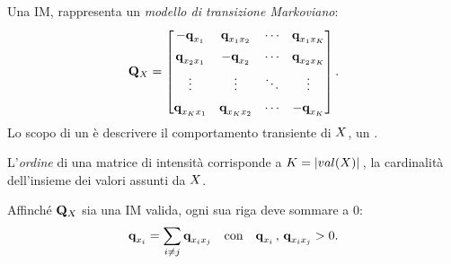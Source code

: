 \begin{definizione}[\upcase\im*{}]
\label{defn:im}
Una \acf{IM}, rappresenta un \emph{modello di transizione Markoviano}:
\[
\mathbf{Q}_{\mathnormal{X}}=
\begin{bmatrix}
    -\boldsymbol{\textbf{\text{q}}}_{\mathnormal{x}_1}            & \boldsymbol{\textbf{\text{q}}}_{\mathnormal{x}_1\mathnormal{x}_2}    & \cdots & \boldsymbol{\textbf{\text{q}}}_{\mathnormal{x}_1\mathnormal{x}_K}   \\[0.5em]
    \boldsymbol{\textbf{\text{q}}}_{\mathnormal{x}_2\mathnormal{x}_1}  & -\boldsymbol{\textbf{\text{q}}}_{\mathnormal{x}_2}              & \cdots & \boldsymbol{\textbf{\text{q}}}_{\mathnormal{x}_2\mathnormal{x}_K}   \\[0.5em]
    \vdots                              & \vdots                                & \ddots & \vdots                               \\[0.5em]
    \boldsymbol{\textbf{\text{q}}}_{\mathnormal{x}_K\mathnormal{x}_1}  & \boldsymbol{\textbf{\text{q}}}_{\mathnormal{x}_K\mathnormal{x}_2}    & \cdots & -\boldsymbol{\textbf{\text{q}}}_{\mathnormal{x}_K}
\end{bmatrix}\text{.}
\]
Lo scopo di un \im*{} è descrivere il comportamento transiente di $\mathnormal{X}$, un \mprocess*{} \omog*{}.
\end{definizione}
\begin{osservazione}
L'\emph{ordine} di una matrice di intensità corrisponde a $K=|val(\mathnormal{X})|\,$, la cardinalità dell'insieme dei valori assunti da $\mathnormal{X}$.
\end{osservazione}
Affinché $\mathbf{Q}_{\mathnormal{X}}$ sia una \acl{IM} valida, ogni sua riga deve sommare a $0$:
\[
\boldsymbol{\textbf{\text{q}}}_{\mathnormal{x}_i}=\sum_{i \neq j}\boldsymbol{\textbf{\text{q}}}_{\mathnormal{x}_i\mathnormal{x}_j}\quad\text{con}\quad \boldsymbol{\textbf{\text{q}}}_{\mathnormal{x}_i}\,,\,\boldsymbol{\textbf{\text{q}}}_{\mathnormal{x}_i\mathnormal{x}_j}>0\text{.}
\]

